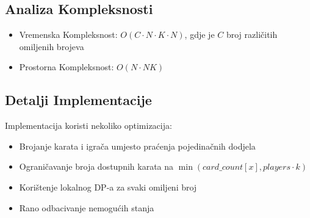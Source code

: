 \subsection{Analiza Kompleksnosti}
\begin{itemize}
    \item Vremenska Kompleksnost: $O(C \cdot N \cdot K \cdot N)$, gdje je $C$ broj različitih omiljenih brojeva
    \item Prostorna Kompleksnost: $O(N \cdot NK)$
\end{itemize}

\subsection{Detalji Implementacije}
Implementacija koristi nekoliko optimizacija:
\begin{itemize}
    \item Brojanje karata i igrača umjesto praćenja pojedinačnih dodjela
    \item Ograničavanje broja dostupnih karata na $\min(card\_count[x], players \cdot k)$
    \item Korištenje lokalnog DP-a za svaki omiljeni broj
    \item Rano odbacivanje nemogućih stanja
\end{itemize} 